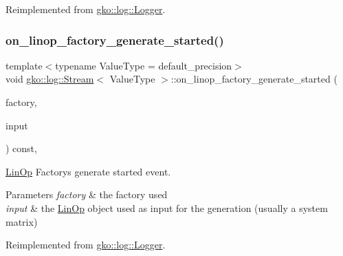 Reimplemented from \hyperlink{classgko_1_1log_1_1Logger}{gko\+::log\+::\+Logger}.

\mbox{\label{classgko_1_1log_1_1Stream_afa60da90a69a07a79ac8c8837aeb02cd}} 
\subsubsection{\texorpdfstring{on\+\_\+linop\+\_\+factory\+\_\+generate\+\_\+started()}{on\_linop\_factory\_generate\_started()}}
{\footnotesize\ttfamily template$<$typename Value\+Type  = default\+\_\+precision$>$ \\
void \hyperlink{classgko_1_1log_1_1Stream}{gko\+::log\+::\+Stream}$<$ Value\+Type $>$\+::on\+\_\+linop\+\_\+factory\+\_\+generate\+\_\+started (\begin{DoxyParamCaption}\item[{const \hyperlink{classgko_1_1LinOpFactory}{Lin\+Op\+Factory} $\ast$}]{factory,  }\item[{const \hyperlink{classgko_1_1LinOp}{Lin\+Op} $\ast$}]{input }\end{DoxyParamCaption}) const\hspace{0.3cm}{\ttfamily [override]}, {\ttfamily [virtual]}}



\hyperlink{classgko_1_1LinOp}{Lin\+Op} Factory\textquotesingle{}s generate started event. 


\begin{DoxyParams}{Parameters}
{\em factory} & the factory used \\
\hline
{\em input} & the \hyperlink{classgko_1_1LinOp}{Lin\+Op} object used as input for the generation (usually a system matrix) \\
\hline
\end{DoxyParams}


Reimplemented from \hyperlink{classgko_1_1log_1_1Logger}{gko\+::log\+::\+Logger}.

\mbox{\label{classgko_1_1log_1_1Stream_a63029c1558fa8c8c5d3a5489e31afa66}} 
